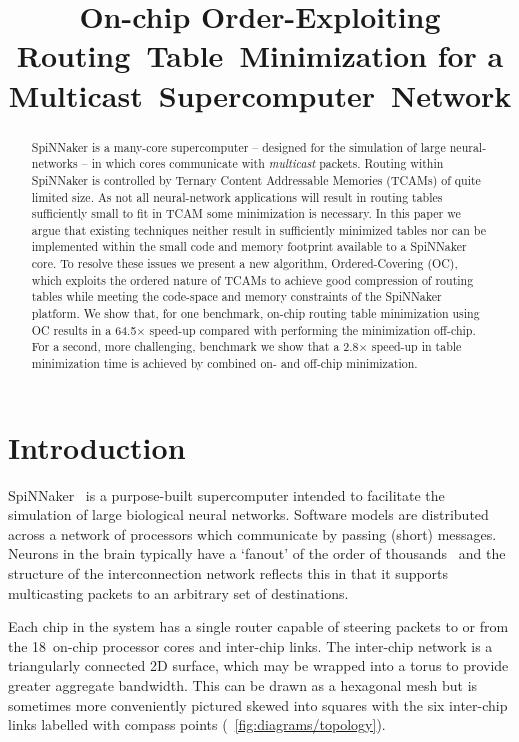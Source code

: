 \documentclass[conference]{IEEEtran}
\title{On-chip Order-Exploiting Routing~Table~Minimization for a Multicast~Supercomputer~Network}
\author{%
  \IEEEauthorblockN{Andrew~Mundy, Jonathan~Heathcote and Jim~D.~Garside}
  \IEEEauthorblockA{School of Computer Science,
                    University of Manchester, UK}
}
\begin{document}
  \maketitle

  \begin{abstract}
SpiNNaker is a many-core supercomputer -- designed for the simulation of large neural-networks -- in which cores communicate with \emph{multicast} packets.
Routing within SpiNNaker is controlled by Ternary Content Addressable Memories (TCAMs) of quite limited size.
As not all neural-network applications will result in routing tables sufficiently small to fit in TCAM some minimization is necessary.
In this paper we argue that existing techniques neither result in sufficiently minimized tables nor can be implemented within the small code and memory footprint available to a SpiNNaker core.
To resolve these issues we present a new algorithm, Ordered-Covering (OC), which exploits the ordered nature of TCAMs to achieve good compression of routing tables while meeting the code-space and memory constraints of the SpiNNaker platform.
We show that, for one benchmark, on-chip routing table minimization using OC results in a 64.5$\times$ speed-up compared with performing the minimization off-chip.
For a second, more challenging, benchmark we show that a 2.8$\times$ speed-up in table minimization time is achieved by combined on- and off-chip minimization.
  \end{abstract}

  \section{Introduction}

SpiNNaker~\parencite{Furber2014} is a purpose-built supercomputer intended to facilitate the simulation of large biological neural networks.
Software models are distributed across a network of processors which communicate by passing (short) messages.
Neurons in the brain typically have a `fanout' of the order of thousands~\parencite{Kung1988} and the structure of the interconnection network reflects this in that it supports multicasting packets to an arbitrary set of destinations.

Each chip in the system has a single router capable of steering packets to or from the 18~on-chip processor cores and inter-chip links.
The inter-chip network is a triangularly connected 2D surface, which may be wrapped into a torus to provide greater aggregate bandwidth.
This can be drawn as a hexagonal mesh but is sometimes more conveniently pictured skewed into squares with the six inter-chip links labelled with compass points (\figurename~\ref{fig:diagrams/topology}).
\end{document}
